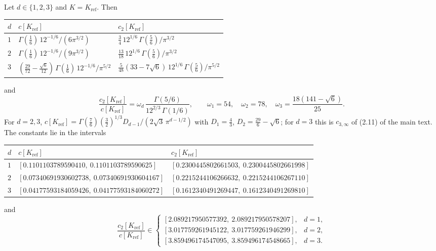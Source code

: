 \begin{theorem}\label{thm:ctwo-closed}
Let $d\in\{1,2,3\}$ and $K=K_{\mathrm{ref}}$. Then
\begin{center}
\renewcommand{\arraystretch}{1.35}
\begin{tabular}{@{}lll@{}}
\toprule
$d$ & $c[K_{\mathrm{ref}}]$ & $c_2[K_{\mathrm{ref}}]$\\
\midrule
$1$ & $\Gamma(\frac16)\,12^{-1/6}/(6\pi^{3/2})$ & $\frac34\,12^{1/6}\,\Gamma(\frac56)/\pi^{3/2}$\\
$2$ & $\Gamma(\frac16)\,12^{-1/6}/(9\pi^{3/2})$ & $\frac{13}{18}\,12^{1/6}\,\Gamma(\frac56)/\pi^{3/2}$\\
$3$ & $(\frac{29}{72}-\frac{\sqrt6}{12})\,\Gamma(\frac16)\,12^{-1/6}/\pi^{5/2}$ & $\frac5{48}(33-7\sqrt6)\,12^{1/6}\,\Gamma(\frac56)/\pi^{5/2}$\\
\bottomrule
\end{tabular}
\end{center}
and
\begin{equation}\label{eq:ctwo-ratio}
\frac{c_2[K_{\mathrm{ref}}]}{c[K_{\mathrm{ref}}]}=\omega_d\,\frac{\Gamma(5/6)}{12^{2/3}\,\Gamma(1/6)},\qquad \omega_1=54,\quad \omega_2=78,\quad \omega_3=\frac{18(141-\sqrt6)}{25}.
\end{equation}
For $d=2,3$, $c[K_{\mathrm{ref}}]=\Gamma(\frac76)(\frac32)^{1/3}D_{d-1}/(2\sqrt3\,\pi^{d-1/2})$ with $D_1=\frac43$, $D_2=\frac{29}6-\sqrt6$; for $d=3$ this is $c_{3,\infty}$ of (2.11) of the main text. The constants lie in the intervals
\begin{center}
\renewcommand{\arraystretch}{1.25}\setlength{\tabcolsep}{4pt}\small
\begin{tabular}{@{}lll@{}}
\toprule
$d$ & $c[K_{\mathrm{ref}}]$ & $c_2[K_{\mathrm{ref}}]$\\
\midrule
$1$ & $[0.1101103789590410,\ 0.1101103789590625]$ & $[0.2300445802661503,\ 0.2300445802661998]$\\
$2$ & $[0.07340691930602738,\ 0.07340691930604167]$ & $[0.2215244106266632,\ 0.2215244106267110]$\\
$3$ & $[0.04177593184059426,\ 0.04177593184060272]$ & $[0.1612340491269447,\ 0.1612340491269810]$\\
\bottomrule
\end{tabular}
\end{center}
and
\[
\frac{c_2[K_{\mathrm{ref}}]}{c[K_{\mathrm{ref}}]}\in
\begin{cases}
[2.089217950577392,\ 2.089217950578207], & d=1,\\
[3.017759261945122,\ 3.017759261946299], & d=2,\\
[3.859496174547095,\ 3.859496174548665], & d=3.
\end{cases}
\]
\end{theorem}

